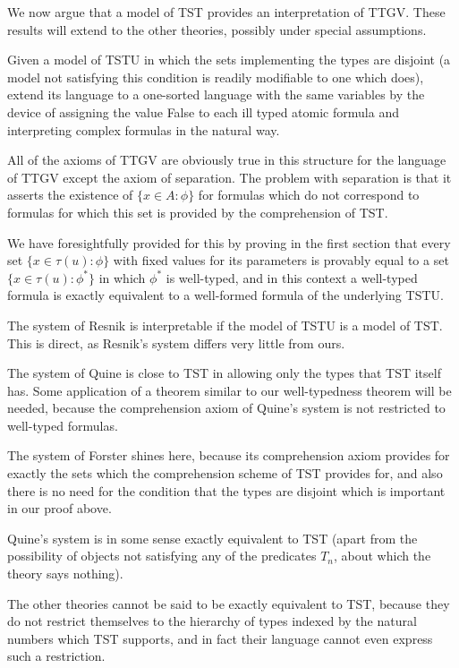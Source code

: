 \documentclass[12pt]{article}
\begin{document}
We now argue that a model of TST provides an interpretation of TTGV.  These results will extend
to the other theories, possibly under special assumptions.

Given a model of TSTU in which the sets implementing the types are disjoint (a model not satisfying this condition is readily modifiable to one which does), extend its language to a one-sorted language with the same variables
by the device of assigning the value False to each ill typed atomic formula and interpreting complex formulas in the natural way.

All of the axioms of TTGV are obviously true in this structure for the language of TTGV except the axiom of separation.  The problem with separation is that it asserts the existence of $\{x \in A:\phi\}$ for formulas
which do not correspond to formulas for which this set is provided by the comprehension of TST.

We have foresightfully provided for this by proving in the first section that every set $\{x \in \tau(u):\phi\}$ with fixed values for its parameters is provably equal to a set $\{x \in \tau(u):\phi^*\}$ in which $\phi^*$ is well-typed, and in this context a well-typed formula is exactly equivalent to a well-formed formula of the underlying TSTU.

The system of Resnik is interpretable if the model of TSTU is a model of TST.  This is direct, as Resnik's system differs very little from ours.

The system of Quine is close to TST in allowing only the types that TST itself has.  Some application of a theorem similar to our well-typedness theorem will be needed, because the comprehension axiom of Quine's system is not restricted to well-typed formulas.

The system of Forster shines here, because its comprehension axiom provides for exactly the sets which the comprehension scheme of TST provides for, and also there is no need for the condition that the types are disjoint which is important in our proof above.

Quine's system is in some sense exactly equivalent to TST (apart from the possibility of objects not satisfying any of the predicates $T_n$, about which the theory says nothing).

The other theories cannot be said to be exactly equivalent to TST, because they do not restrict themselves to the hierarchy of types indexed by the natural numbers which TST supports, and in fact their language cannot even express such a restriction.
\end{document}
